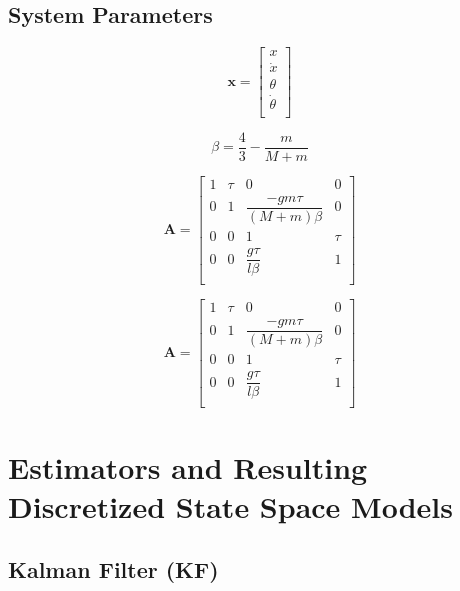 \documentclass{article}
\newcommand{\matr}[1]{\bm{#1}}     %
\begin{document}
\subsection{System Parameters}

\begin{equation}
\matr{x} = 
\begin{bmatrix}
	x \\
	\dot{x} \\
	\theta \\
	\dot{\theta} \\
\end{bmatrix}
\label{xMatrix}
\end{equation}

\begin{equation}
\beta = \dfrac{4}{3} - \dfrac{m}{M+m}
\end{equation}

\begin{equation}
\matr{A} = 
\begin{bmatrix}
	1 & \tau & 0 & 0 \\
	0 & 1 & \dfrac{-gm\tau}{(M+m)\beta} & 0 \\
	0 & 0 & 1 & \tau \\
	0 & 0 & \dfrac{g\tau}{l\beta} & 1 \\
\end{bmatrix}
\label{aMatrix}
\end{equation}

\begin{equation}
\matr{A} = 
\begin{bmatrix}
	1 & \tau & 0 & 0 \\
	0 & 1 & \dfrac{-gm\tau}{(M+m)\beta} & 0 \\
	0 & 0 & 1 & \tau \\
	0 & 0 & \dfrac{g\tau}{l\beta} & 1 \\
\end{bmatrix}
\label{aMatrix}
\end{equation}

\section{Estimators and Resulting Discretized State Space Models}
\subsection{Kalman Filter (KF)}
\end{document}
